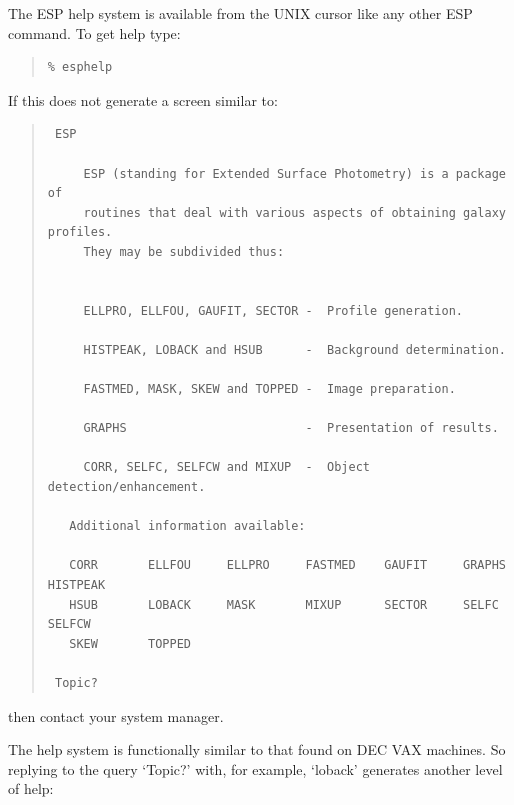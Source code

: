 \documentclass[twoside,11pt]{article}
\newenvironment{myquote}{\begin{quote}\begin{small}}{\end{small}\end{quote}}
\begin{document}
The ESP help system is available from the UNIX cursor like any other ESP
command. To get help type:
 
\begin{myquote}
\begin{verbatim}
% esphelp
\end{verbatim}
\end{myquote}

If this does not generate a screen similar to:

\begin{myquote}
\begin{verbatim}    
 ESP
 
     ESP (standing for Extended Surface Photometry) is a package of
     routines that deal with various aspects of obtaining galaxy profiles.
     They may be subdivided thus:
 
 
     ELLPRO, ELLFOU, GAUFIT, SECTOR -  Profile generation.
 
     HISTPEAK, LOBACK and HSUB      -  Background determination.
 
     FASTMED, MASK, SKEW and TOPPED -  Image preparation.
 
     GRAPHS                         -  Presentation of results.
 
     CORR, SELFC, SELFCW and MIXUP  -  Object detection/enhancement.
 
   Additional information available:
 
   CORR       ELLFOU     ELLPRO     FASTMED    GAUFIT     GRAPHS     HISTPEAK   
   HSUB       LOBACK     MASK       MIXUP      SECTOR     SELFC      SELFCW     
   SKEW       TOPPED
 
 Topic? 
 \end{verbatim}
\end{myquote}

then contact your system manager.

The help system is functionally  similar to that found on DEC VAX machines.
So replying to the query `Topic?' with, for example, `loback' generates 
another level of help:
\end{document}
